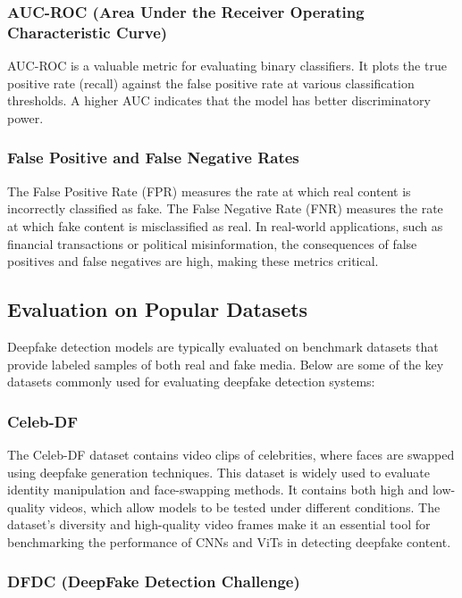 \documentclass[lettersize,journal]{IEEEtran}
\begin{document}
\subsubsection{AUC-ROC (Area Under the Receiver Operating Characteristic Curve)}

AUC-ROC is a valuable metric for evaluating binary classifiers. It plots the true positive rate (recall) against the false positive rate at various classification thresholds. A higher AUC indicates that the model has better discriminatory power.\cite{kingra2023siamnet}

\subsubsection{False Positive and False Negative Rates}
The False Positive Rate (FPR) measures the rate at which real content is incorrectly classified as fake. The False Negative Rate (FNR) measures the rate at which fake content is misclassified as real. In real-world applications, such as financial transactions or political misinformation, the consequences of false positives and false negatives are high, making these metrics critical.

\subsection{Evaluation on Popular Datasets}

\noindent Deepfake detection models are typically evaluated on benchmark datasets that provide labeled samples of both real and fake media. Below are some of the key datasets commonly used for evaluating deepfake detection systems:

\subsubsection{Celeb-DF}

The Celeb-DF dataset contains video clips of celebrities, where faces are swapped using deepfake generation techniques. This dataset is widely used to evaluate identity manipulation and face-swapping methods. It contains both high and low-quality videos, which allow models to be tested under different conditions. The dataset's diversity and high-quality video frames make it an essential tool for benchmarking the performance of CNNs and ViTs in detecting deepfake content.\cite{kingra2025assessing}

\subsubsection{DFDC (DeepFake Detection Challenge)}
\end{document}
